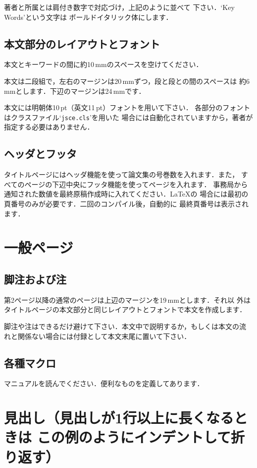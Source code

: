 \documentclass[dvipdfmx]{jsce}
\begin{document}
著者と所属とは肩付き数字で対応づけ，上記のように並べて
下さい．`{\fontkeywords Key Words}'という文字は
ボールドイタリック体にします．

\subsection{本文部分のレイアウトとフォント}

本文とキーワードの間に約10\,mmのスペースを空けてください．

本文は二段組で，左右のマージンは20\,mmずつ，段と段との間のスペースは
約6\,mmとします．下辺のマージンは24\,mmです．

本文には明朝体10\,pt（英文11\,pt）フォントを用いて下さい．
各部分のフォントはクラスファイル`{\tt jsce.cls}'を用いた
場合には自動化されていますから，著者が指定する必要はありません．

\subsection{ヘッダとフッタ}

タイトルページにはヘッダ機能を使って論文集の号巻数を入れます．また，
すべてのページの下辺中央にフッタ機能を使ってページを入れます．
事務局から通知された数値を最終原稿作成時に入れてください．\LaTeX の
場合には最初の頁番号のみが必要です．二回のコンパイル後，自動的に
最終頁番号は表示されます．

\section{一般ページ}

\subsection{脚注および注}

第2ページ以降の通常のページは上辺のマージンを19\,mmとします．それ以
外はタイトルページの本文部分と同じレイアウトとフォントで本文を作成します．

脚注や注はできるだけ避けて下さい．本文中で説明するか，もしくは本文の流
れと関係ない場合には付録として本文末尾に置いて下さい．

\subsection{各種マクロ}

マニュアルを読んでください．便利なものを定義してあります．

\section{見出し（見出しが1行以上に長くなるときは
この例のようにインデントして折り返す）}
\end{document}
